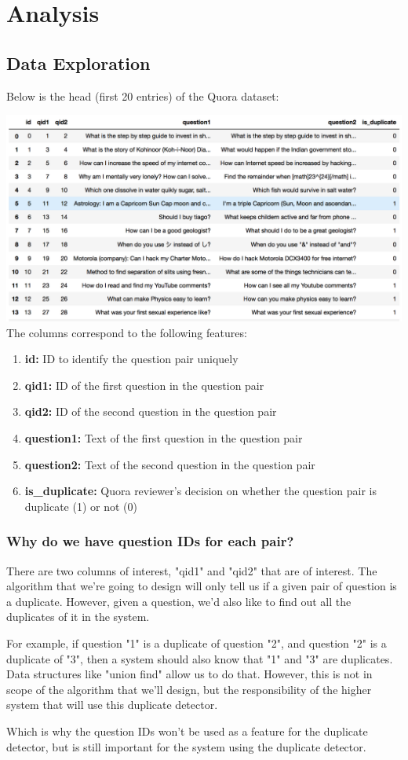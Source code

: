 \documentclass{article}
\begin{document}
\newpage
\section{Analysis}

\subsection{Data Exploration}

Below is the head (first 20 entries) of the Quora dataset:

\noindent\includegraphics[width=\textwidth]{data_head}
The columns correspond to the following features:

\begin{enumerate}
\item{\textbf{id:} ID to identify the question pair uniquely}
\item{\textbf{qid1:} ID of the first question in the question pair}
\item{\textbf{qid2:} ID of the second question in the question pair}
\item{\textbf{question1:} Text of the first question in the question pair}
\item{\textbf{question2:} Text of the second question in the question pair}
\item{\textbf{is\_duplicate:} Quora reviewer's decision on whether the question pair is duplicate (1) or not (0)}
\end{enumerate}

\subsubsection{Why do we have question IDs for each pair?}
There are two columns of interest, "qid1" and "qid2" that are of interest. The algorithm that we're going to design will only tell us if a given pair of question is a duplicate. However, given a question, we'd also like to find out all the duplicates of it in the system.

For example, if question "1" is a duplicate of question "2", and question "2" is a duplicate of "3", then a system should also know that "1" and "3" are duplicates. Data structures like "union find" allow us to do that. However, this is not in scope of the algorithm that we'll design, but the responsibility of the higher system that will use this duplicate detector.

Which is why the question IDs won't be used as a feature for the duplicate detector, but is still important for the system using the duplicate detector.
\end{document}
